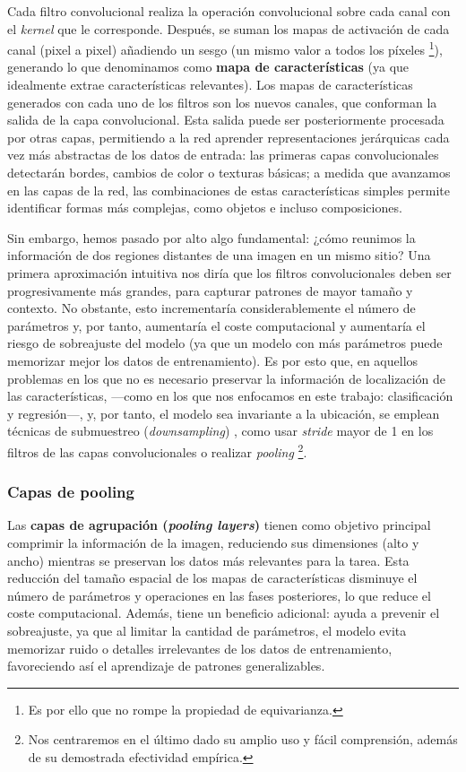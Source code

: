 Cada filtro convolucional realiza la operación convolucional sobre cada canal con el \textit{kernel} que le 
corresponde. Después, se suman los mapas de activación de cada canal (pixel a pixel) añadiendo un sesgo 
(un mismo valor a todos los píxeles
\footnote{
    Es por ello que no rompe la propiedad de equivarianza.
}),
generando lo que denominamos como \textbf{mapa de características} (ya que idealmente extrae 
características relevantes). Los mapas de características generados con cada uno de los filtros son los nuevos 
canales, que conforman la salida de la capa convolucional. Esta salida puede ser posteriormente procesada por 
otras capas, permitiendo a la red aprender representaciones jerárquicas cada vez más abstractas de los datos 
de entrada: las primeras capas convolucionales detectarán bordes, cambios de color o texturas básicas; a 
medida que avanzamos en las capas de la red, las combinaciones de estas características simples permite 
identificar formas más complejas, como objetos e incluso composiciones.

Sin embargo, hemos pasado por alto algo fundamental: ¿cómo reunimos la información de dos regiones distantes 
de una imagen en un mismo sitio? Una primera aproximación intuitiva nos diría que los filtros convolucionales 
deben ser progresivamente más grandes, para capturar patrones de mayor tamaño y contexto. No obstante, esto
incrementaría considerablemente el número de parámetros y, por tanto, aumentaría el coste computacional y 
aumentaría el riesgo de sobreajuste del modelo (ya que un modelo con más parámetros puede memorizar mejor los
datos de entrenamiento). Es por esto que, en aquellos problemas en los que no es necesario preservar la 
información de localización de las características, ---como en los que nos enfocamos en este trabajo: 
clasificación y regresión---, y, por tanto, el modelo sea invariante a la ubicación, se emplean técnicas de 
submuestreo (\textit{downsampling}) \cite{murphy2022}, como usar \textit{stride} mayor de 1 en los filtros
de las capas convolucionales o realizar \textit{pooling}
\footnote{
    Nos centraremos en el último dado su amplio uso y fácil comprensión, además de su demostrada efectividad 
    empírica.
}.



\subsubsection{Capas de pooling}

Las \textbf{capas de agrupación (\textit{pooling layers})} tienen como objetivo principal comprimir la 
información de la imagen, reduciendo sus dimensiones (alto y ancho) mientras se preservan los datos más 
relevantes para la tarea. Esta reducción del tamaño espacial de los mapas de características disminuye el 
número de parámetros y operaciones en las fases posteriores, lo que reduce el coste computacional. Además, 
tiene un beneficio adicional: ayuda a prevenir el sobreajuste, ya que al limitar la cantidad de parámetros, 
el modelo evita memorizar ruido o detalles irrelevantes de los datos de entrenamiento, favoreciendo así el 
aprendizaje de patrones generalizables.

